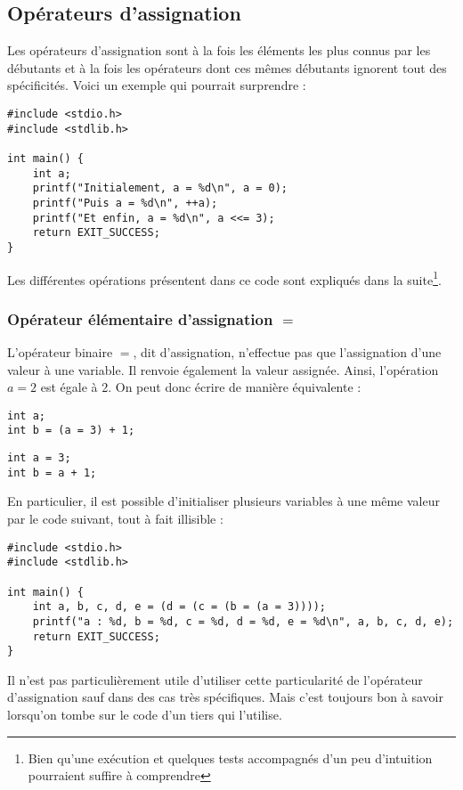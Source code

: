 \documentclass[../../../main.tex]{subfiles}
\begin{document}
\subsection{Opérateurs d'assignation}
\label{sub:op_rateurs_d_assignation}
Les opérateurs d'assignation sont à la fois les éléments les plus connus par les débutants et à la fois les opérateurs dont ces mêmes débutants ignorent tout des spécificités. Voici un exemple qui pourrait surprendre :
\begin{verbatim}
#include <stdio.h>
#include <stdlib.h>

int main() {
	int a;
	printf("Initialement, a = %d\n", a = 0);
	printf("Puis a = %d\n", ++a);
	printf("Et enfin, a = %d\n", a <<= 3);
	return EXIT_SUCCESS;
}
\end{verbatim}
Les différentes opérations présentent dans ce code sont expliqués dans la suite\footnote{Bien qu'une exécution et quelques tests accompagnés d'un peu d'intuition pourraient suffire à comprendre}.
 
\subsubsection{Opérateur élémentaire d'assignation $=$}
\label{ssub:op_rateur_l_mentaire_d_assignation_egal}
L'opérateur binaire $=$, dit d'assignation, n'effectue pas que l'assignation d'une valeur à une variable. Il renvoie également la valeur assignée.\newline
Ainsi, l'opération $a = 2$ est égale à 2. On peut donc écrire de manière équivalente :

\begin{minipage}{0.5\textwidth}
\begin{verbatim}
int a;
int b = (a = 3) + 1;
\end{verbatim}
\end{minipage}
\begin{minipage}{0.5\textwidth}
\begin{verbatim}
int a = 3;
int b = a + 1;
\end{verbatim}
\end{minipage}

En particulier, il est possible d'initialiser plusieurs variables à une même valeur par le code suivant, tout à fait illisible :
\begin{verbatim}
#include <stdio.h>
#include <stdlib.h>

int main() {
	int a, b, c, d, e = (d = (c = (b = (a = 3))));
	printf("a : %d, b = %d, c = %d, d = %d, e = %d\n", a, b, c, d, e);
	return EXIT_SUCCESS;
}
\end{verbatim}
Il n'est pas particulièrement utile d'utiliser cette particularité de l'opérateur d'assignation sauf dans des cas très spécifiques. Mais c'est toujours bon à savoir lorsqu'on tombe sur le code d'un tiers qui l'utilise.
 
\end{document}
